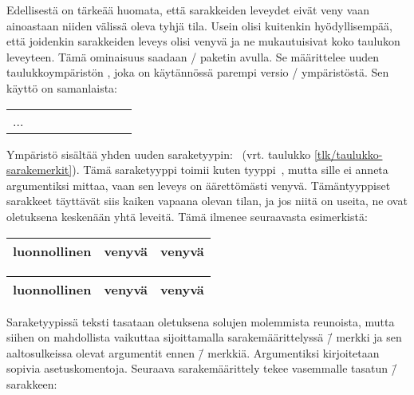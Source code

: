 Edellisestä on tärkeää huomata, että sarakkeiden leveydet eivät veny
vaan ainoastaan niiden välissä oleva tyhjä tila. Usein olisi kuitenkin
hyödyllisempää, että joidenkin sarakkeiden leveys olisi venyvä ja ne
mukautuisivat koko taulukon leveyteen. Tämä ominaisuus saadaan
\-/ paketin avulla. Se määrittelee
uuden taulukkoympäristön , joka on käytännössä
parempi versio \-/ ympäristöstä. Sen käyttö on
samanlaista:

\begin{koodilohkosis}
\begin{tabularx}{leveys}[sijainti]{sarakkeet}
  ...
\end{tabularx}
\end{koodilohkosis}

Ympäristö  sisältää yhden uuden
saraketyypin:~ (vrt. taulukko
\ref{tlk/taulukko-sarakemerkit}). Tämä saraketyyppi toimii kuten
tyyppi~, mutta sille ei anneta argumentiksi mittaa, vaan sen
leveys on äärettömästi venyvä. Tämäntyyppiset sarakkeet täyttävät siis
kaiken vapaana olevan tilan, ja jos niitä on useita, ne ovat oletuksena
keskenään yhtä leveitä. Tämä ilmenee seuraavasta esimerkistä:

\begin{koodilohkosis}
\begin{tabularx}{\linewidth}{|l|X|X|}
  \hline luonnollinen & venyvä & venyvä \\ \hline
\end{tabularx}
\end{koodilohkosis}

\begin{tulossis}
  \renewcommand{\arraystretch}{1.2}
  \begin{tabularx}{\linewidth}{|l|X|X|}
    \hline luonnollinen & venyvä & venyvä \\ \hline
  \end{tabularx}
\end{tulossis}

Saraketyypissä  teksti tasataan oletuksena solujen
molemmista reunoista, mutta siihen on mahdollista vaikuttaa
sijoittamalla sarakemäärittelyssä \koodi{>}\=/ merkki ja sen
aaltosulkeissa olevat argumentit ennen \=/ merkkiä.
Argumentiksi kirjoitetaan sopivia asetuskomentoja. Seuraava
sarakemäärittely tekee vasemmalle tasatun \=/ sarakkeen:

